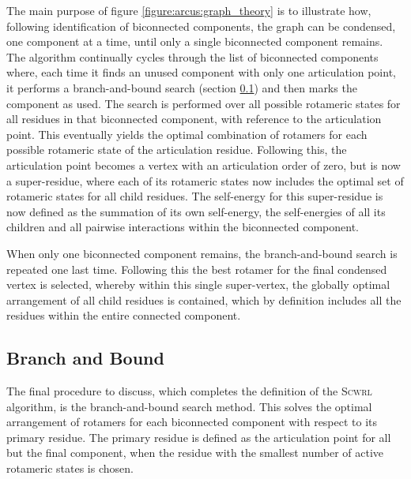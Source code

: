 The main purpose of figure \ref{figure:arcus:graph_theory} is to illustrate how, following identification of biconnected components, the graph can be condensed, one component at a time, until only a single biconnected component remains. The algorithm continually cycles through the list of biconnected components where,  each time it finds an unused component with only one articulation point, it performs a branch-and-bound search (section \ref{section:arcus:scrwl:branch_bound}) and then marks the component as used. The search is performed over all possible rotameric states for all residues in that biconnected component, with reference to the articulation point. This eventually yields the optimal combination of rotamers for each possible rotameric state of the articulation residue. Following this, the articulation point becomes a vertex with an articulation order of zero, but is now a super-residue, where each of its rotameric states now includes the optimal set of rotameric states for all child residues. The self-energy for this super-residue is now defined as the summation of its own self-energy, the self-energies of all its children and all pairwise interactions within the biconnected component. 

When only one biconnected component remains, the branch-and-bound search is repeated one last time. Following this the best rotamer for the final condensed vertex is selected, whereby within this single super-vertex, the globally optimal arrangement of all child residues is contained, which by definition includes all the residues within the entire connected component.


\subsection{Branch and Bound}
\label{section:arcus:scrwl:branch_bound}

The final procedure to discuss, which completes the definition of the \textsc{Scwrl} algorithm, is the branch-and-bound search method. This solves the optimal arrangement of rotamers for each biconnected component with respect to its primary residue. The primary residue is defined as the articulation point for all but the final component, when the residue with the smallest number of active rotameric states is chosen. 

